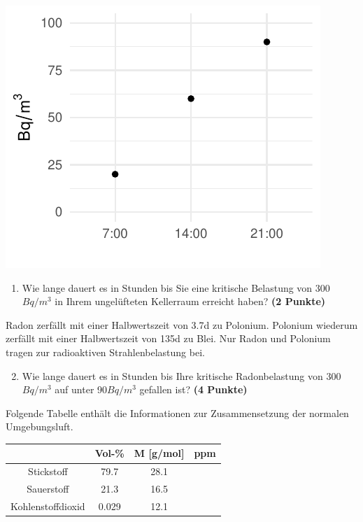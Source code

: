 \documentclass[a4paper, 9pt]{scrartcl}\usepackage[]{graphicx}\usepackage[]{xcolor}
\makeatletter
\def\maxwidth{ %
  \ifdim\Gin@nat@width>\linewidth
    \linewidth
  \else
    \Gin@nat@width
  \fi
}
\newenvironment{knitrout}{}{} %
\makeatother
\begin{document}
\begin{knitrout}
\color{fgcolor}

{\centering \includegraphics[width=\maxwidth]{img/math-10-1} 

}


\end{knitrout}

\vspace{-0.75cm}

\begin{enumerate}
\item Wie lange dauert es in Stunden bis Sie eine kritische Belastung von 300$Bq/m^3$ in Ihrem ungelüfteten Kellerraum erreicht haben? \textbf{(2 Punkte)}
\end{enumerate}

Radon zerfällt mit einer Halbwertszeit von 3.7d zu Polonium. Polonium wiederum zerfällt mit einer Halbwertszeit von 135d zu Blei. Nur Radon und Polonium tragen zur radioaktiven Strahlenbelastung bei.

\begin{enumerate}
  \setcounter{enumi}{1}
\item Wie lange dauert es in Stunden bis Ihre kritische Radonbelastung von
  300$Bq/m^3$ auf unter 90$Bq/m^3$ gefallen ist?
  \textbf{(4 Punkte)}
\end{enumerate}

Folgende Tabelle enthält die Informationen zur Zusammensetzung der normalen Umgebungsluft.

\begin{center}
  \begin{tabular}{ c|c|c|c }
     & Vol-\% & M [g/mol] & ppm \\
    \hline
    Stickstoff & 79.7 & 28.1 &
                                                    \phantom{1000000000000}\strut\\
        \hline
    Sauerstoff & 21.3 & 16.5 &
                                                    \phantom{10000000}\strut\\
        \hline
    Kohlenstoffdioxid & 0.029 & 12.1 & \phantom{10000000}\strut\\     
     \hline
\end{tabular}
\end{center}
\end{document}
